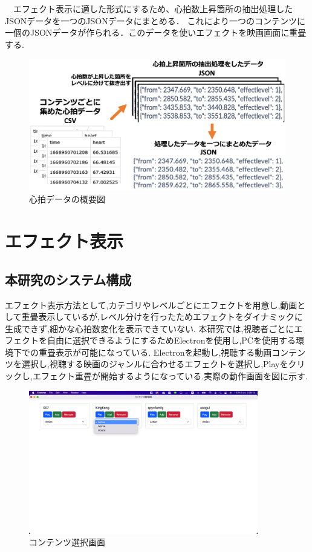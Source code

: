 　エフェクト表示に適した形式にするため、心拍数上昇箇所の抽出処理したJSONデータを一つのJSONデータにまとめる．
これにより一つのコンテンツに一個のJSONデータが作られる．このデータを使いエフェクトを映画画面に重畳する.

\begin{figure}[H]
    \centering
    \includegraphics[width=15cm]{images/chapter3/system.png}
    \caption{心拍データの概要図}
\end{figure}







\section{エフェクト表示}
\subsection{本研究のシステム構成}
エフェクト表示方法として,カテゴリやレベルごとにエフェクトを用意し,動画として重畳表示しているが,レベル分けを行ったためエフェクトをダイナミックに生成できず,細かな心拍数変化を表示できていない.
本研究では,視聴者ごとにエフェクトを自由に選択できるようにするためElectronを使用し,PCを使用する環境下での重畳表示が可能になっている.
Electronを起動し,視聴する動画コンテンツを選択し,視聴する映画のジャンルに合わせるエフェクトを選択し,Playをクリックし,エフェクト重畳が開始するようになっている.実際の動作画面を図に示す.

\begin{figure}[H]
    \centering
    \includegraphics[width=10cm]{images/chapter3/contents.jpg}
    \caption{コンテンツ選択画面}
\end{figure}

